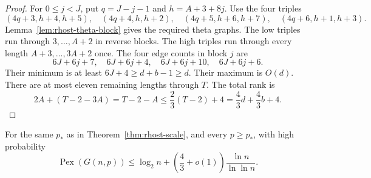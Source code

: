 \begin{proof}
For $0\le j<J$, put $q=J-j-1$ and $h=A+3+8j$.
Use the four triples
\[
 (4q+3,h+4,h+5),\quad (4q+4,h,h+2),\quad
 (4q+5,h+6,h+7),\quad (4q+6,h+1,h+3).
\]
Lemma~\ref{lem:rhost-theta-block} gives the required theta graphs.
The low triples run through $3,\ldots,A+2$ in reverse blocks.
The high triples run through every length $A+3,\ldots,3A+2$ once.
The four edge counts in block $j$ are
\[
 6J+6j+7,\quad6J+6j+4,\quad6J+6j+10,\quad6J+6j+6.
\]
Their minimum is at least $6J+4\ge d+b-1\ge d$.
Their maximum is $O(d)$.
There are at most eleven remaining lengths through $T$.
The total rank is
\[
 2A+(T-2-3A)=T-2-A
 \le\frac23(T-2)+4=\frac43d+\frac43b+4.
\]
\end{proof}

\begin{theorem}
\label{thm:rhost-four-thirds}
For the same $p_*$ as in Theorem~\ref{thm:rhost-scale}, and every $p\ge p_*$,
with high probability
\[
 \operatorname{Pex}(G(n,p))
 \le\log_2n+\left(\frac43+o(1)\right)\frac{\ln n}{\ln\ln n}.
\]
\end{theorem}

